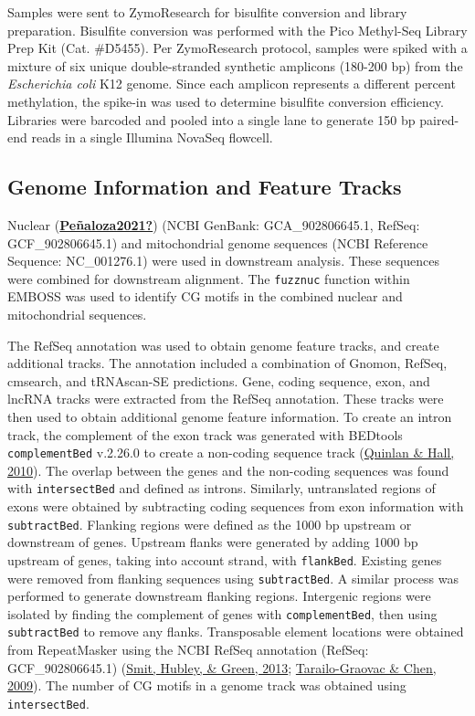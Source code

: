 \documentclass [11pt, proquest] {uwthesis}[2015/03/03]
\begin{document}
Samples were sent to ZymoResearch for bisulfite conversion and library preparation. Bisulfite conversion was performed with the Pico Methyl-Seq Library Prep Kit (Cat. \#D5455). Per ZymoResearch protocol, samples were spiked with a mixture of six unique double-stranded synthetic amplicons (180-200 bp) from the \emph{Escherichia coli} K12 genome. Since each amplicon represents a different percent methylation, the spike-in was used to determine bisulfite conversion efficiency. Libraries were barcoded and pooled into a single lane to generate 150 bp paired-end reads in a single Illumina NovaSeq flowcell.

\hypertarget{genome-information-and-feature-tracks-1}{%
\subsection{Genome Information and Feature Tracks}\label{genome-information-and-feature-tracks-1}}

Nuclear (\protect\hyperlink{ref-Peuxf1aloza2021}{\textbf{Peñaloza2021?}}) (NCBI GenBank: GCA\_902806645.1, RefSeq: GCF\_902806645.1) and mitochondrial genome sequences (NCBI Reference Sequence: NC\_001276.1) were used in downstream analysis. These sequences were combined for downstream alignment. The \texttt{fuzznuc} function within EMBOSS was used to identify CG motifs in the combined nuclear and mitochondrial sequences.

The RefSeq annotation was used to obtain genome feature tracks, and create additional tracks. The annotation included a combination of Gnomon, RefSeq, cmsearch, and tRNAscan-SE predictions. Gene, coding sequence, exon, and lncRNA tracks were extracted from the RefSeq annotation. These tracks were then used to obtain additional genome feature information. To create an intron track, the complement of the exon track was generated with BEDtools \texttt{complementBed} v.2.26.0 to create a non-coding sequence track (\protect\hyperlink{ref-Quinlan2010}{Quinlan \& Hall, 2010}). The overlap between the genes and the non-coding sequences was found with \texttt{intersectBed} and defined as introns. Similarly, untranslated regions of exons were obtained by subtracting coding sequences from exon information with \texttt{subtractBed}. Flanking regions were defined as the 1000 bp upstream or downstream of genes. Upstream flanks were generated by adding 1000 bp upstream of genes, taking into account strand, with \texttt{flankBed}. Existing genes were removed from flanking sequences using \texttt{subtractBed}. A similar process was performed to generate downstream flanking regions. Intergenic regions were isolated by finding the complement of genes with \texttt{complementBed}, then using \texttt{subtractBed} to remove any flanks. Transposable element locations were obtained from RepeatMasker using the NCBI RefSeq annotation (RefSeq: GCF\_902806645.1) (\protect\hyperlink{ref-Smit2013}{Smit, Hubley, \& Green, 2013}; \protect\hyperlink{ref-Tarailo-Graovac2009}{Tarailo-Graovac \& Chen, 2009}). The number of CG motifs in a genome track was obtained using \texttt{intersectBed}.
\end{document}
